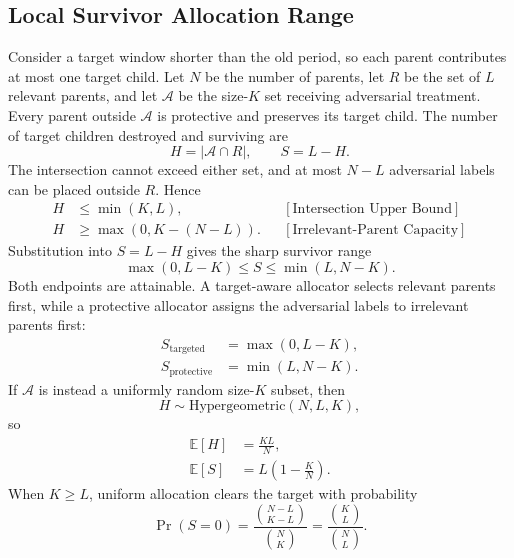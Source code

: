 \subsection{Local Survivor Allocation Range}
Consider a target window shorter than the old period, so each parent contributes at most one target child. Let $N$ be the number of parents, let $R$ be the set of $L$ relevant parents, and let $\mathcal A$ be the size-$K$ set receiving adversarial treatment. Every parent outside $\mathcal A$ is protective and preserves its target child. The number of target children destroyed and surviving are
\begin{equation*}
H=|\mathcal A\cap R|,
\qquad
S=L-H.
\end{equation*}
The intersection cannot exceed either set, and at most $N-L$ adversarial labels can be placed outside $R$. Hence
\begin{equation*}
\begin{aligned}
H
&\le\min(K,L),
&&[\text{Intersection Upper Bound}]\\
H
&\ge\max(0,K-(N-L)).
&&[\text{Irrelevant-Parent Capacity}]
\end{aligned}
\end{equation*}
Substitution into $S=L-H$ gives the sharp survivor range
\begin{equation*}
\max(0,L-K)
\le S\le
\min(L,N-K).
\end{equation*}
Both endpoints are attainable. A target-aware allocator selects relevant parents first, while a protective allocator assigns the adversarial labels to irrelevant parents first:
\begin{equation*}
\begin{aligned}
S_{\mathrm{targeted}}&=\max(0,L-K),\\
S_{\mathrm{protective}}&=\min(L,N-K).
\end{aligned}
\end{equation*}
If $\mathcal A$ is instead a uniformly random size-$K$ subset, then
\begin{equation*}
H\sim\text{Hypergeometric}(N,L,K),
\end{equation*}
so
\begin{equation*}
\begin{aligned}
\mathbb E[H]&=\frac{KL}{N},\\
\mathbb E[S]&=L\left(1-\frac KN\right).
\end{aligned}
\end{equation*}
When $K\ge L$, uniform allocation clears the target with probability
\begin{equation*}
\Pr(S=0)
=\frac{\binom{N-L}{K-L}}{\binom NK}
=\frac{\binom KL}{\binom NL}.
\end{equation*}
